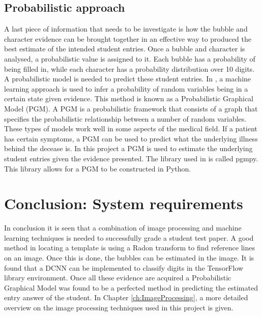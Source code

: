 \subsection{Probabilistic approach}

A last piece of information that needs to be investigate is how the bubble and character evidence can be brought together in an effective way to produced the best estimate of the intended student entries. Once a bubble and character is analysed, a probabilistic value is assigned to it. Each bubble has a probability of being filled in, while each character has a probability distribution over 10 digits. A probabilistic model is needed to predict these student entries. In \citet{pgmPy}, a machine learning approach is used to infer a probability of random variables being in a certain state given evidence. This method is known as a Probabilistic Graphical Model (PGM). A PGM is a probabilistic framework that consists of a graph that specifies the probabilistic relationship between a number of random variables. These types of models work well in some aspects of the medical field. If a patient has certain symptoms, a PGM can be used to predict what the underlying illness behind the decease is. In this project a PGM is used to estimate the underlying student entries given the evidence presented. The library used in \citet{pgmPy} is called pgmpy. This library allows for a PGM to be constructed in Python. 

\section{Conclusion: System requirements}
In conclusion it is seen that a combination of image processing and machine learning techniques is needed to successfully grade a student test paper. A good method in locating a template is using a Radon transform to find reference lines on an image. Once this is done, the bubbles can be estimated in the image. It is found that a DCNN can be implemented to classify digits in the TensorFlow library environment. Once all these evidence are acquired a Probabilistic Graphical Model was found to be a perfected method in predicting the estimated entry answer of the student.
In Chapter \ref{ch:ImageProcessing}, a more detailed overview on the image processing techniques used in this project is given.
